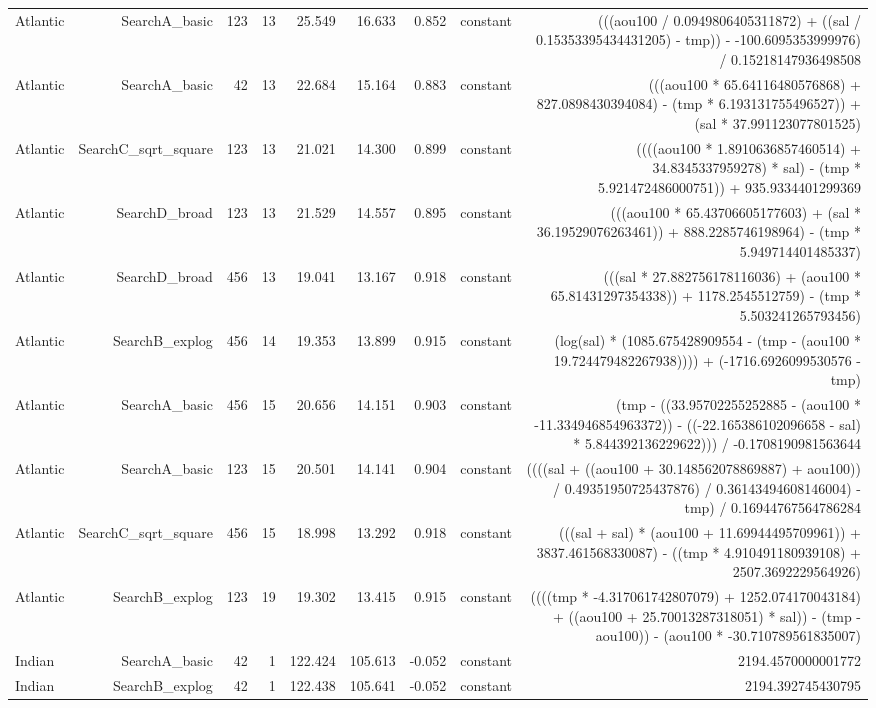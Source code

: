 \begin{table}
{\begin{tabular}{lrrrrrrrr}
Atlantic & SearchA\_basic & 123 & 13 & 25.549 & 16.633 & 0.852 & constant & (((aou100 / 0.0949806405311872) + ((sal / 0.15353395434431205) - tmp)) - -100.6095353999976) / 0.15218147936498508 \\
Atlantic & SearchA\_basic & 42 & 13 & 22.684 & 15.164 & 0.883 & constant & (((aou100 * 65.64116480576868) + 827.0898430394084) - (tmp * 6.193131755496527)) + (sal * 37.991123077801525) \\
Atlantic & SearchC\_sqrt\_square & 123 & 13 & 21.021 & 14.300 & 0.899 & constant & ((((aou100 * 1.8910636857460514) + 34.8345337959278) * sal) - (tmp * 5.921472486000751)) + 935.9334401299369 \\
Atlantic & SearchD\_broad & 123 & 13 & 21.529 & 14.557 & 0.895 & constant & (((aou100 * 65.43706605177603) + (sal * 36.19529076263461)) + 888.2285746198964) - (tmp * 5.949714401485337) \\
Atlantic & SearchD\_broad & 456 & 13 & 19.041 & 13.167 & 0.918 & constant & (((sal * 27.882756178116036) + (aou100 * 65.81431297354338)) + 1178.2545512759) - (tmp * 5.503241265793456) \\
Atlantic & SearchB\_explog & 456 & 14 & 19.353 & 13.899 & 0.915 & constant & (log(sal) * (1085.675428909554 - (tmp - (aou100 * 19.724479482267938)))) + (-1716.6926099530576 - tmp) \\
Atlantic & SearchA\_basic & 456 & 15 & 20.656 & 14.151 & 0.903 & constant & (tmp - ((33.95702255252885 - (aou100 * -11.334946854963372)) - ((-22.165386102096658 - sal) * 5.844392136229622))) / -0.1708190981563644 \\
Atlantic & SearchA\_basic & 123 & 15 & 20.501 & 14.141 & 0.904 & constant & ((((sal + ((aou100 + 30.148562078869887) + aou100)) / 0.49351950725437876) / 0.36143494608146004) - tmp) / 0.16944767564786284 \\
Atlantic & SearchC\_sqrt\_square & 456 & 15 & 18.998 & 13.292 & 0.918 & constant & (((sal + sal) * (aou100 + 11.69944495709961)) + 3837.461568330087) - ((tmp * 4.910491180939108) + 2507.3692229564926) \\
Atlantic & SearchB\_explog & 123 & 19 & 19.302 & 13.415 & 0.915 & constant & ((((tmp * -4.317061742807079) + 1252.074170043184) + ((aou100 + 25.70013287318051) * sal)) - (tmp - aou100)) - (aou100 * -30.710789561835007) \\
Indian & SearchA\_basic & 42 & 1 & 122.424 & 105.613 & -0.052 & constant & 2194.4570000001772 \\
Indian & SearchB\_explog & 42 & 1 & 122.438 & 105.641 & -0.052 & constant & 2194.392745430795 \\

\end{tabular}}
\end{table}
